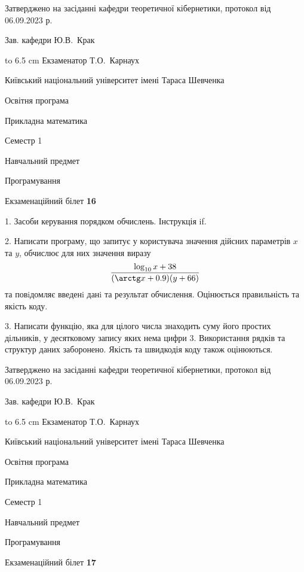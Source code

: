 \documentclass[12pt, ukrainian]{article}
\begin{document}
{\smallskip\smallskip \begin {scriptsize} Затверджено на засіданні кафедри теоретичної кібернетики, протокол   від   06.09.2023 р.\par\smallskip\smallskip\smallskip\smallskip
{\parbox {6.5 cm} {Зав. кафедри \dotfill Ю.В.~Крак}}\hspace {0.7cm} {\hbox to 6.5 cm { Екзаменатор \dotfill Т.О.~Карнаух}} \end{scriptsize}}
\newpage
{{\begin {scriptsize}\par
{ \center  Київський національний університет імені Тараса Шевченка \par}
{\parbox {5 cm}{Освітня програма \hfill}{\parbox {7 cm}{Прикладна математика\hfill}}\parbox {6 cm}{\hfill Семестр 1}}\par
{\parbox {5 cm} {Навчальний предмет \hfill}\parbox {7 cm}{Програмування \hfill}\parbox {6cm}{\hfill}\par}\vspace{-15pt} \end{scriptsize}}{\center Екзаменаційний білет \No \textbf { 16 }\par}}
{%
1. Засоби керування порядком обчислень. Інструкція if.%
\par
2. Написати програму, що запитує у користувача значення дійсних параметрів $x$ та $y$, обчислює для них значення виразу 
$$\frac{\log_{10} x + 38}{(\arctg x + 0.9) (y + 66)}$$ 
та повiдомляє введенi данi та результат обчислення.
 Оцінюється правильність та якість коду.

\par
3. Написати функцію, яка для цілого числа знаходить суму його простих дільників, у десятковому запису яких нема цифри 3.  Використання рядків та структур даних заборонено. Якість та швидкодія коду також оцінюються. 

}
{\smallskip\smallskip \begin {scriptsize} Затверджено на засіданні кафедри теоретичної кібернетики, протокол   від   06.09.2023 р.\par\smallskip\smallskip\smallskip\smallskip
{\parbox {6.5 cm} {Зав. кафедри \dotfill Ю.В.~Крак}}\hspace {0.7cm} {\hbox to 6.5 cm { Екзаменатор \dotfill Т.О.~Карнаух}} \end{scriptsize}}
\vspace{0.9cm}
{{\begin {scriptsize}\par
{ \center  Київський національний університет імені Тараса Шевченка \par}
{\parbox {5 cm}{Освітня програма \hfill}{\parbox {7 cm}{Прикладна математика\hfill}}\parbox {6 cm}{\hfill Семестр 1}}\par
{\parbox {5 cm} {Навчальний предмет \hfill}\parbox {7 cm}{Програмування \hfill}\parbox {6cm}{\hfill}\par}\vspace{-15pt} \end{scriptsize}}{\center Екзаменаційний білет \No \textbf { 17 }\par}}
\end{document}
